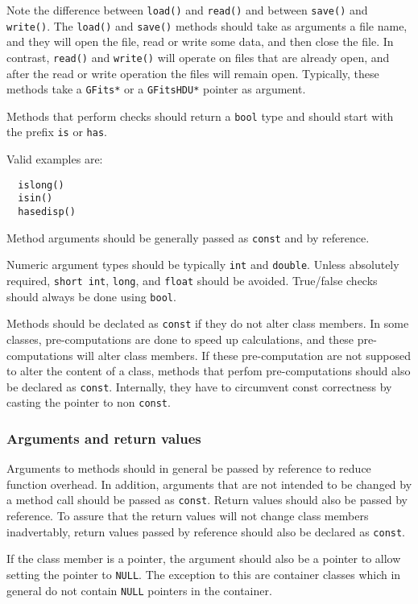 \documentclass{article}[12pt,a4]
\begin{document}
Note the difference between {\tt load()} and {\tt read()} and between {\tt save()} and {\tt write()}.
The {\tt load()} and {\tt save()} methods should take as arguments a file name, and they
will open the file, read or write some data, and then close the file.
In contrast, {\tt read()} and {\tt write()} will operate on files that are already open, and after
the read or write operation the files will remain open.
Typically, these methods take a {\tt GFits*} or a {\tt GFitsHDU*} pointer as argument.

Methods that perform checks should return a {\tt bool} type and should start with the
prefix {\tt is} or {\tt has}.

Valid examples are:
\begin{verbatim}
  islong()
  isin()
  hasedisp()
\end{verbatim}

Method arguments should be generally passed as {\tt const} and by reference.

Numeric argument types should be typically {\tt int} and {\tt double}.
Unless absolutely required, {\tt short int}, {\tt long}, and {\tt float} should be avoided.
True/false checks should always be done using {\tt bool}.

Methods should be declated as {\tt const} if they do not alter class members.
In some classes, pre-computations are done to speed up calculations, and these
pre-computations will alter class members.
If these pre-computation are not supposed to alter the content of a class,
methods that perfom pre-computations should also be declared as {\tt const}.
Internally, they have to circumvent const correctness by casting the pointer to
non {\tt const}.


\subsubsection{Arguments and return values}

Arguments to methods should in general be passed by reference to reduce function
overhead.
In addition, arguments that are not intended to be changed by a method call should
be passed as {\tt const}.
Return values should also be passed by reference.
To assure that the return values will not change class members inadvertably, return
values passed by reference should also be declared as {\tt const}.

If the class member is a pointer, the argument should also be a pointer to allow
setting the pointer to {\tt NULL}.
The exception to this are container classes which in general do not contain
{\tt NULL} pointers in the container.
\end{document}
